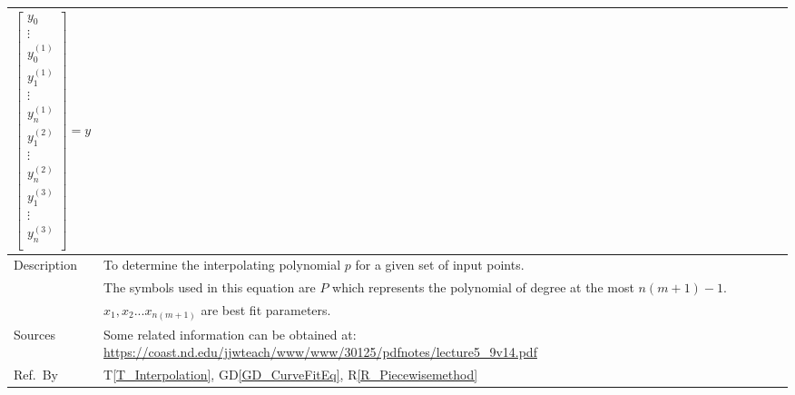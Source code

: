 \documentclass[12pt]{article}
\newcommand{\colAwidth}{0.13\textwidth}
\newcommand{\colBwidth}{0.82\textwidth}
\newcommand{\dref}[1]{GD\ref{#1}}
\newcommand{\tref}[1]{T\ref{#1}}
\newcommand{\rref}[1]{R\ref{#1}}
\begin{document}
\begin{minipage}{\textwidth}
\begin{tabular}{| p{\colAwidth} | p{\colBwidth}|}
\begin{equation*}
		\begin{bmatrix}
		y_0  \\
		\vdots \\
		y_0 ^{(1)} \\
		y_1 ^{(1)} \\
		\vdots \\
		y_n ^{(1)} \\
		y_1 ^{(2)} \\
		\vdots \\
		y_n ^{(2)} \\  
		y_1 ^{(3)} \\
		\vdots \\
		y_n ^{(3)} \\ 
		\end{bmatrix} = y
		\end{equation*}\\ 
		
		\hline
		
		Description & To determine the interpolating polynomial $p$ for a given set of input points.\\
		& The symbols used in this equation are $P$ which represents the polynomial of degree at the most $n(m+1)-1$.\\
		& $x_1, x_2 ... x_{n(m+1)}$ are best fit parameters.\\
		\hline
		
		Sources& Some related information can be obtained at: \url{https://coast.nd.edu/jjwteach/www/www/30125/pdfnotes/lecture5_9v14.pdf}\\
		\hline
		
		Ref.\ By & \tref{T_Interpolation}, \dref{GD_CurveFitEq}, \rref{R_Piecewisemethod}\\
		\hline
	\end{tabular}
\end{minipage}\\
~\newline
\noindent
\end{document}
